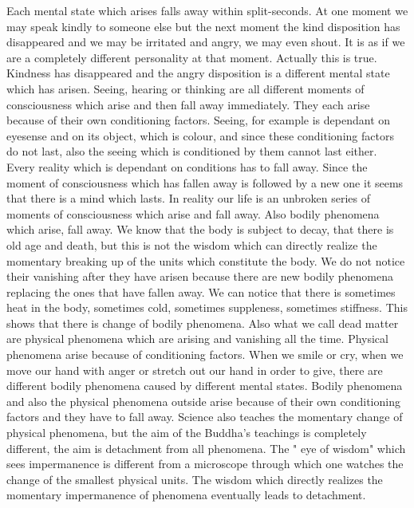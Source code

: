 \documentclass{book}
\begin{document}
Each mental state which arises falls away within split-seconds. At one
moment we may speak kindly to someone else but the next moment the kind
disposition has disappeared and we may be irritated and angry, we may
even shout. It is as if we are a completely different personality at
that moment. Actually this is true. Kindness has disappeared and the
angry disposition is a different mental state which has arisen. Seeing,
hearing or thinking are all different moments of consciousness which
arise and then fall away immediately. They each arise because of their
own conditioning factors. Seeing, for example is dependant on eyesense
and on its object, which is colour, and since these conditioning factors
do not last, also the seeing which is conditioned by them cannot last
either. Every reality which is dependant on conditions has to fall away.
Since the moment of consciousness which has fallen away is followed by a
new one it seems that there is a mind which lasts. In reality our life
is an unbroken series of moments of consciousness which arise and fall
away. Also bodily phenomena which arise, fall away. We know that the
body is subject to decay, that there is old age and death, but this is
not the wisdom which can directly realize the momentary breaking up of
the units which constitute the body. We do not notice their vanishing
after they have arisen because there are new bodily phenomena replacing
the ones that have fallen away. We can notice that there is sometimes
heat in the body, sometimes cold, sometimes suppleness, sometimes
stiffness. This shows that there is change of bodily phenomena. Also
what we call dead matter are physical phenomena which are arising and
vanishing all the time. Physical phenomena arise because of conditioning
factors. When we smile or cry, when we move our hand with anger or
stretch out our hand in order to give, there are different bodily
phenomena caused by different mental states. Bodily phenomena and also
the physical phenomena outside arise because of their own conditioning
factors and they have to fall away. Science also teaches the momentary
change of physical phenomena, but the aim of the Buddha's teachings is
completely different, the aim is detachment from all phe­nomena. The "
eye of wisdom" which sees impermanence is different from a microscope
through which one watches the change of the smallest physical units. The
wisdom which directly realizes the momentary impermanence of phenomena
eventually leads to detachment.
\end{document}
